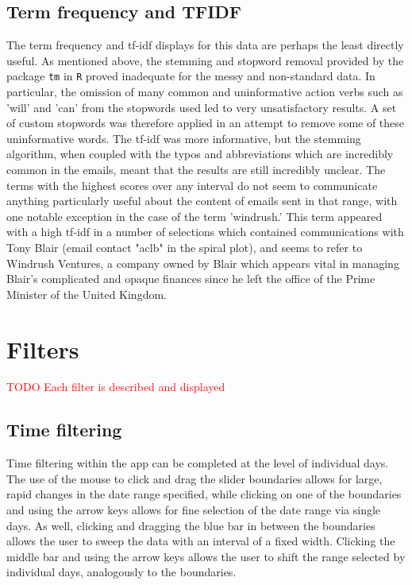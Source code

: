 \documentclass[journal]{vgtc}                %
\newcommand*{\TODO}[1]{\textcolor{red}{TODO #1}}
\begin{document}
\subsection{Term frequency and TFIDF}
The term frequency and tf-idf displays for this data are perhaps the least directly useful. As mentioned above, the stemming and stopword removal provided by the package \texttt{tm} in \texttt{R} proved inadequate for the messy and non-standard data. In particular, the omission of many common and uninformative action verbs such as 'will' and 'can' from the stopwords used led to very unsatisfactory results. A set of custom stopwords was therefore applied in an attempt to remove some of these uninformative words. The tf-idf was more informative, but the stemming algorithm, when coupled with the typos and abbreviations which are incredibly common in the emails, meant that the results are still incredibly unclear. The terms with the highest scores over any interval do not seem to communicate anything particularly useful about the content of emails sent in that range, with one notable exception in the case of the term 'windrush.' This term appeared with a high tf-idf in a number of selections which contained communications with Tony Blair (email contact "aclb" in the spiral plot), and seems to refer to Windrush Ventures, a company owned by Blair which appears vital in managing Blair's complicated and opaque finances since he left the office of the Prime Minister of the United Kingdom. \cite{windrushTelegraph, windrushGuardian}

\section{Filters}
\TODO{Each filter is described and displayed }
\subsection{Time filtering}
Time filtering within the app can be completed at the level of individual days. The use of the mouse to click and drag the slider boundaries allows for large, rapid changes in the date range specified, while clicking on one of the boundaries and using the arrow keys allows for fine selection of the date range via single days. As well, clicking and dragging the blue bar in between the boundaries allows the user to sweep the data with an interval of a fixed width. Clicking the middle bar and using the arrow keys allows the user to shift the range selected by individual days, analogously to the boundaries.
\end{document}

